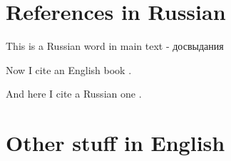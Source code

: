 \documentclass[12pt,a4paper]{article}
\begin{document}
\section*{References in Russian}

This is a Russian word in main text - \foreignlanguage{russian}{досвыдания}

Now I cite an English book \parencite{Bara2006}. 



And here I cite a Russian one   \parencite{Baranov2001}.


\printbibliography

\section*{Other stuff in English}
\end{document}
